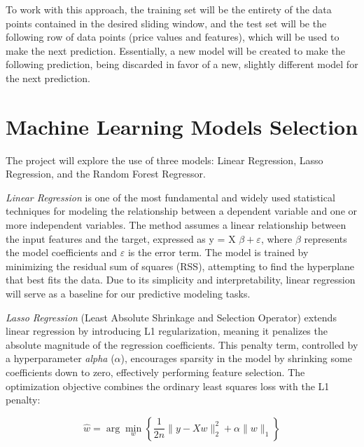 \documentclass[12pt]{report} %
\begin{document}
To work with this approach, the training set will be the entirety of the data points contained in the desired sliding window, and the test set will be the following row of data points (price values and features), which will be used to make the next prediction. Essentially, a new model will be created to make the following prediction, being discarded in favor of a new, slightly different model for the next prediction.


\section{Machine Learning Models Selection}

The project will explore the use of three models: Linear Regression, Lasso Regression, and the Random Forest Regressor.

\textit{Linear Regression} \cite{linear_regression} is one of the most fundamental and widely used statistical techniques for modeling the relationship between a dependent variable and one or more independent variables. The method assumes a linear relationship between the input features and the target, expressed as y = X $\beta + \varepsilon $, where $\beta$ represents the model coefficients and $\varepsilon$ is the error term. The model is trained by minimizing the residual sum of squares (RSS), attempting to find the hyperplane that best fits the data. Due to its simplicity and interpretability, linear regression will serve as a baseline for our predictive modeling tasks.

\textit{Lasso Regression} \cite{lasso_regression} (Least Absolute Shrinkage and Selection Operator) extends linear regression by introducing L1 regularization, meaning it penalizes the absolute magnitude of the regression coefficients. This penalty term, controlled by a hyperparameter \textit{alpha} ($\alpha$), encourages sparsity in the model by shrinking some coefficients down to zero, effectively performing feature selection. The optimization objective combines the ordinary least squares loss with the L1 penalty:

\begin{equation*}
\hat{w} = \arg\min_{w} \left\{ \frac{1}{2n} \| y - Xw \|_2^2 + \alpha \| w \|_1 \right\}
\end{equation*}
\end{document}
